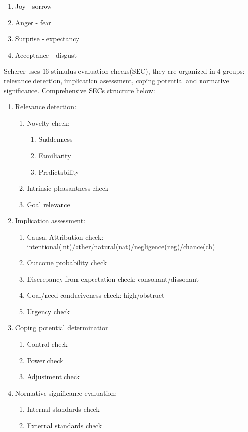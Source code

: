 \begin{enumerate}
\item  Joy - sorrow
\item  Anger - fear
\item  Surprise - expectancy
\item  Acceptance - disgust
\end{enumerate}

Scherer uses 16 stimulus evaluation checks(SEC), they are organized in 4 groups: relevance detection, implication assessment, coping potential and normative significance.
Comprehensive SECs structure below:

\begin{enumerate}
\item  Relevance detection:
\begin{enumerate}
\item  Novelty check:
\begin{enumerate}
\item  Suddenness
\item  Familiarity
\item  Predictability
\end{enumerate}
\item  Intrinsic pleasantness check
\item  Goal relevance
\end{enumerate}
\item  Implication assessment:
\begin{enumerate}
\item  Causal Attribution check: intentional(int)/other/natural(nat)/negligence(neg)/chance(ch)
\item  Outcome probability check
\item  Discrepancy from expectation check: consonant/dissonant
\item  Goal/need conduciveness check: high/obstruct
\item  Urgency check
\end{enumerate}
\item  Coping potential determination
\begin{enumerate}
\item  Control check
\item  Power check
\item  Adjustment check
\end{enumerate}
\item  Normative significance evaluation:
\begin{enumerate}
\item  Internal standards check
\item  External standards check
\end{enumerate}
\end{enumerate}

